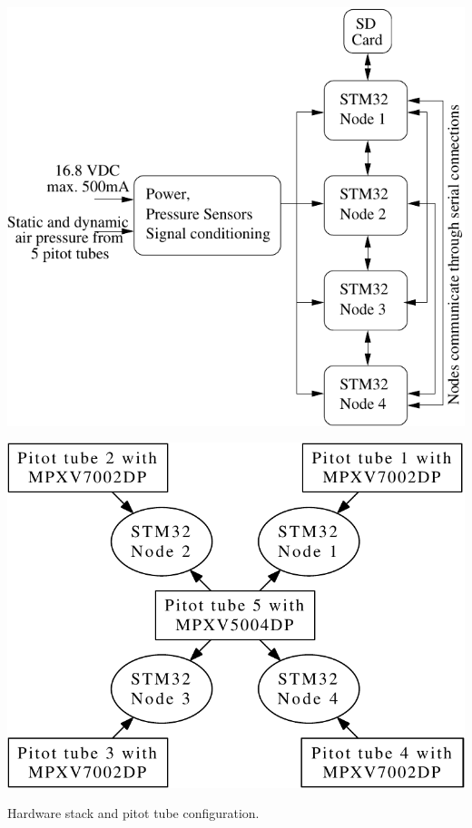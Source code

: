 \begin{myfig}
  \begin{minipage}{0.5\linewidth}
    \centering
    \includegraphics[scale=0.5]{Figs/architecture}
  \end{minipage}
  \begin{minipage}{0.5\linewidth}
    \centering
    \includegraphics[scale=0.4]{Figs/architecture_sensors}
  \end{minipage}
  \caption{Hardware stack and pitot tube configuration.} \label{fig:case-study}\label{fig:stack-schema}
\end{myfig}

